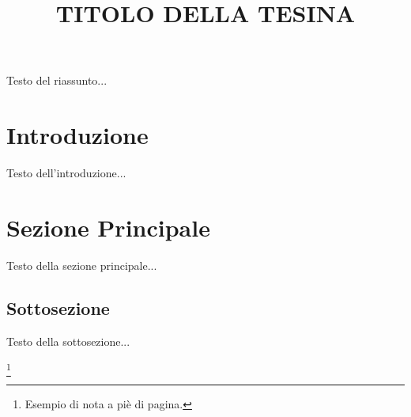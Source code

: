 \documentclass[a4paper,12pt]{article}
\title{\fontsize{14}{17}\bfseries\uppercase{Titolo della Tesina}}
\author{}
\date{}
\begin{document}
\maketitle
\thispagestyle{empty}

\begin{center}
    \vspace{1cm}
    \textbf{\fontsize{12}{15}\selectfont{Riassunto}}
\end{center}

Testo del riassunto...

\newpage

\section{Introduzione}
Testo dell'introduzione...

\section{Sezione Principale}
Testo della sezione principale...

\subsection{Sottosezione}
Testo della sottosezione...

\footnote{Esempio di nota a piè di pagina.}
\end{document}
